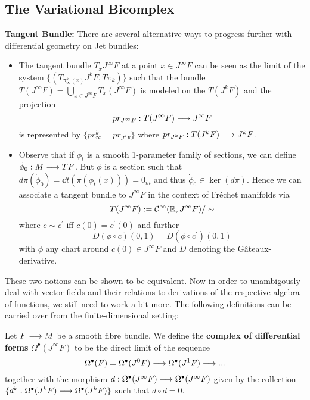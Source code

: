 \subsection{The Variational Bicomplex}

\textbf{Tangent Bundle:} There are several alternative ways to progress further with differential geometry on Jet bundles:
\begin{itemize}
  \item  The tangent bundle $T_xJ^\infty F$ at a point $x\in J^\infty F$ can be seen as the limit of the system $\{ (T_{\pi^k_\infty(x)}J^kF, T\pi_k) \}$ such that the bundle $T(J^\infty F) = \bigcup_{x\in J^\infty F} T_x(J^\infty F)$ is modeled on the $T(J^k F)$ and the projection
  $$ pr_{J^\infty F}: T(J^\infty F) \longrightarrow J^\infty F $$
  is represented by $\{ pr_\infty^k = pr_{J^kF} \}$ where $pr_{J^kF}: T(J^kF) \longrightarrow J^kF$.

  \item Observe that if $\phi_t$ is a smooth 1-parameter family of sections, we can define $\dot \phi_0: M \lra TF$. But $\phi$ is a section such that $d\pi(\dot \phi_0) = \dd{}{t}(\pi(\phi_t(x))) = 0_m$ and thus $\dot \phi_0 \in \ker(d\pi)$. Hence we can associate a tangent bundle to $J^\infty F$ in the context of Fréchet manifolds via
  $$ T(J^\infty F) := \mathcal{C}^{\infty}(\mathbb{R}, J^\infty F) / \sim $$
  where $c\sim c^\prime$ iff $c(0) = c^\prime (0)$ and further
  $$ D(\phi\circ c) (0,1) = D(\phi \circ c^\prime) (0,1) $$
  with $\phi$ any chart around $c(0) \in J^\infty F$ and $D$ denoting the Gâteaux-derivative.
\end{itemize}

These two notions can be shown to be equivalent. Now in order to unambigously deal with vector fields and their relations to derivations of the respective algebra of functions, we still need to work a bit more. The following definitions can be carried over from the finite-dimensional setting:

\begin{definition}
Let $F\longrightarrow M$ be a smooth fibre bundle. We define the \textbf{complex of differential forms} $\Omega^\bullet(J^\infty F)$ to be the direct limit of the sequence
$$ \Omega^\bullet(F) = \Omega^\bullet(J^0F) \longrightarrow \Omega^\bullet(J^1F)\longrightarrow ... $$
together with the morphism $d:\Omega^\bullet(J^\infty F)\longrightarrow \Omega^\bullet(J^\infty F)$ given by the collection $\{ d^k: \Omega^\bullet(J^k F) \longrightarrow \Omega^\bullet(J^k F) \}$ such that $d\circ d = 0$.
\end{definition}

